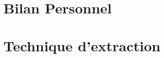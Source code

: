 \documentclass[a4paper,12pt]{article}
\begin{document}












\clearpage


\appendix
\section{Bilan Personnel}


\section{Technique d'extraction}

\end{document}
